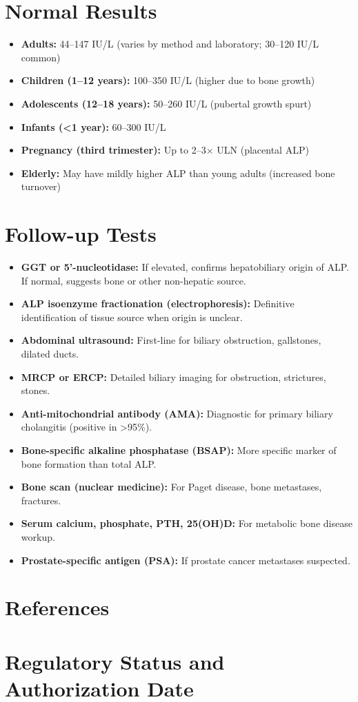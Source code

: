 \section*{Normal Results}
\begin{itemize}
  \item \textbf{Adults:} 44--147 IU/L (varies by method and laboratory; 30--120 IU/L common)
  \item \textbf{Children (1--12 years):} 100--350 IU/L (higher due to bone growth)
  \item \textbf{Adolescents (12--18 years):} 50--260 IU/L (pubertal growth spurt)
  \item \textbf{Infants (<1 year):} 60--300 IU/L
  \item \textbf{Pregnancy (third trimester):} Up to 2--3$\times$ ULN (placental ALP)
  \item \textbf{Elderly:} May have mildly higher ALP than young adults (increased bone turnover)
\end{itemize}

\section*{Follow-up Tests}
\begin{itemize}
  \item \textbf{GGT or 5'-nucleotidase:} If elevated, confirms hepatobiliary origin of ALP. If normal, suggests bone or other non-hepatic source.
  \item \textbf{ALP isoenzyme fractionation (electrophoresis):} Definitive identification of tissue source when origin is unclear.
  \item \textbf{Abdominal ultrasound:} First-line for biliary obstruction, gallstones, dilated ducts.
  \item \textbf{MRCP or ERCP:} Detailed biliary imaging for obstruction, strictures, stones.
  \item \textbf{Anti-mitochondrial antibody (AMA):} Diagnostic for primary biliary cholangitis (positive in >95\%).
  \item \textbf{Bone-specific alkaline phosphatase (BSAP):} More specific marker of bone formation than total ALP.
  \item \textbf{Bone scan (nuclear medicine):} For Paget disease, bone metastases, fractures.
  \item \textbf{Serum calcium, phosphate, PTH, 25(OH)D:} For metabolic bone disease workup.
  \item \textbf{Prostate-specific antigen (PSA):} If prostate cancer metastases suspected.
\end{itemize}

\section*{References}



\clearpage
\section*{Regulatory Status and Authorization Date}

\clearpage
